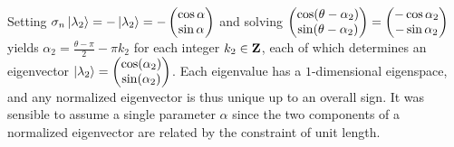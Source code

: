 \begin{answer}
	Setting $\sigma_n \ket{\lambda_2} = - \ket{\lambda_2} = - \begin{pmatrix} \cos \alpha \\ \sin \alpha \end{pmatrix}$ and solving
	$
		\begin{pmatrix}
			\cos\!\left(\theta - \alpha_2\right) \\
			\sin\!\left(\theta - \alpha_2\right)
		\end{pmatrix}
		=
		\begin{pmatrix}
			- \cos \alpha_2 \\
			- \sin \alpha_2
		\end{pmatrix}
	$
	yields $\alpha_2 = \frac{\theta - \pi}{2} - \pi k_2$ for each integer $k_2 \in \mathbf{Z}$, each of which determines an
	eigenvector $\ket{\lambda_2} = \begin{pmatrix} \cos\!\left(\alpha_2\right) \\ \sin\!\left(\alpha_2\right) \end{pmatrix}$.
	Each eigenvalue has a $1$-dimensional eigenspace, and any normalized eigenvector is thus unique up to an overall sign.
	It was sensible to assume a single parameter $\alpha$ since the two components of a normalized eigenvector are related by the constraint of unit length.
\end{answer}

